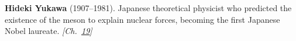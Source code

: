 \nobelphysics \textbf{Hideki Yukawa} (1907–1981). Japanese theoretical physicist who predicted the existence of the meson to explain nuclear forces, becoming the first Japanese Nobel laureate. \emph{[Ch.~\hyperref[ch:cosmicraymuons]{19}]}


